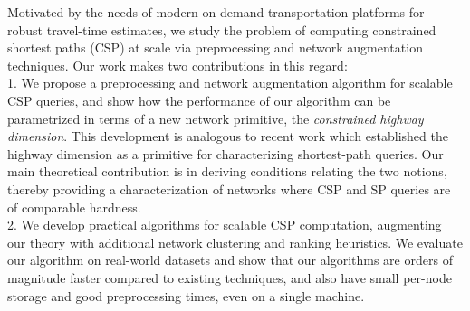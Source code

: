 Motivated by the needs of modern on-demand transportation platforms for robust travel-time estimates, we study the problem of computing constrained shortest paths (CSP) at scale via preprocessing and network augmentation techniques.
Our work makes two contributions in this regard:\\
1. We propose a preprocessing and network augmentation algorithm for scalable CSP queries, and show how the performance of our algorithm can be parametrized in terms of a new network primitive, the \emph{constrained highway dimension}. 
This development is analogous to recent work which established the highway dimension as a primitive for characterizing shortest-path queries. 
Our main theoretical contribution is in deriving conditions relating the two notions, thereby providing a characterization of networks where CSP and SP queries are of comparable hardness.\\
2. We develop practical algorithms for scalable CSP computation, augmenting our theory with additional network clustering and ranking heuristics. We evaluate our algorithm on real-world datasets and show that our algorithms are orders of magnitude faster compared to existing techniques, and also have small per-node storage and good preprocessing times, even on a single machine.